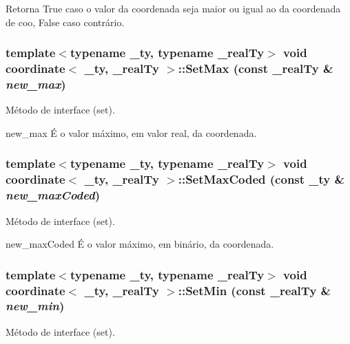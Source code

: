 \begin{DoxyReturn}{Retorna}
True caso o valor da coordenada seja maior ou igual ao da coordenada de coo, False caso contrário. 
\end{DoxyReturn}
\hypertarget{classcoordinate_a74e0f7eaf59e785c37b2d6f92e6f89a9}{
\subsubsection[{SetMax}]{\setlength{\rightskip}{0pt plus 5cm}template$<$typename \_\-ty, typename \_\-realTy$>$ void {\bf coordinate}$<$ \_\-ty, \_\-realTy $>$::SetMax (const \_\-realTy \& {\em new\_\-max})}}
\label{classcoordinate_a74e0f7eaf59e785c37b2d6f92e6f89a9}
Método de interface (set).

new\_\-max É o valor máximo, em valor real, da coordenada. \hypertarget{classcoordinate_a8f1612243c59f409ca70878ea572188a}{
\subsubsection[{SetMaxCoded}]{\setlength{\rightskip}{0pt plus 5cm}template$<$typename \_\-ty, typename \_\-realTy$>$ void {\bf coordinate}$<$ \_\-ty, \_\-realTy $>$::SetMaxCoded (const \_\-ty \& {\em new\_\-maxCoded})}}
\label{classcoordinate_a8f1612243c59f409ca70878ea572188a}
Método de interface (set).

new\_\-maxCoded É o valor máximo, em binário, da coordenada. \hypertarget{classcoordinate_a74810fee94eae241e36552db0041b023}{
\subsubsection[{SetMin}]{\setlength{\rightskip}{0pt plus 5cm}template$<$typename \_\-ty, typename \_\-realTy$>$ void {\bf coordinate}$<$ \_\-ty, \_\-realTy $>$::SetMin (const \_\-realTy \& {\em new\_\-min})}}
\label{classcoordinate_a74810fee94eae241e36552db0041b023}
Método de interface (set).

